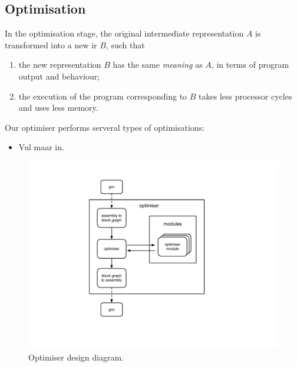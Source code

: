 \subsection*{Optimisation}
In the optimisation stage, the original intermediate representation $A$ is transformed into a new ir $B$, such that
\begin{enumerate}
\item the new representation $B$ has the same \emph{meaning} as $A$, in terms of program output and behaviour;
\item the execution of the program corresponding to $B$ takes less processor cycles and uses less memory.
\end{enumerate}

Our optimiser performs serveral types of optimisations:
\begin{itemize}
\item Vul maar in.
\end{itemize}


\begin{figure}[H]
\centering
\includegraphics[viewport= 170 90 510 490, clip=true]{diagram}
\caption{Optimiser design diagram.}
\label{fig:diagram}
\end{figure}

